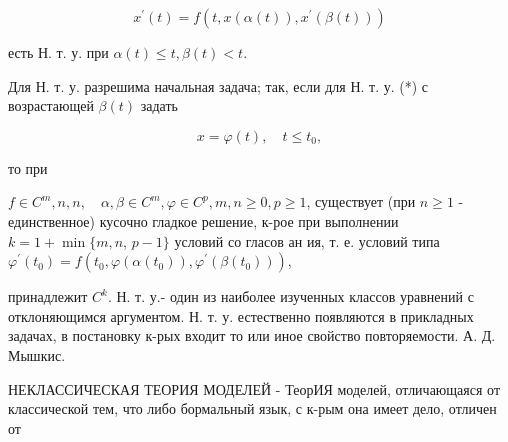 \documentclass[10pt]{article}
\begin{document}
\[

x^{\prime}(t)=f\left(t, x(\alpha(t)), x^{\prime}(\beta(t))\right)

\]



есть Н. т. у. при $\alpha(t) \leqslant t, \beta(t)<t$.



Для Н. т. у. разрешима начальная задача; так, если для Н. т. у. (*) с возрастающей $\beta(t)$ задать



\[

x=\varphi(t), \quad t \leqslant t_{0},

\]



то при



$f \in C^{m}, n, n, \quad \alpha, \beta \in C^{m}, \varphi \in C^{p}, m, n \geqslant 0, p \geqslant 1$, существует (при $n \geqslant 1$ - единственное) кусочно гладкое решение, к-рое при выполнении $k=1+\min \{m, n$, $p-1\}$ условий со гласов ан ия, т. е. условий типа $\varphi^{\prime}\left(t_{0}\right)=f\left(t_{0}, \varphi\left(\alpha\left(t_{0}\right)\right), \varphi^{\prime}\left(\beta\left(t_{0}\right)\right)\right)$,



принадлежит $C^{k}$. Н. т. у.- один из наиболее изученных классов уравнений с отклоняющимся аргументом. Н. т. у. естественно появляются в прикладных задачах, в постановку к-рых входит то или иное свойство повторяемости. А. Д. Мышкис.



НЕКЛАССИЧЕСКАЯ ТЕОРИЯ МОДЕЛЕЙ - ТеорИЯ моделей, отличающаяся от классической тем, что либо бормальный язык, с к-рым она имеет дело, отличен от
\end{document}
